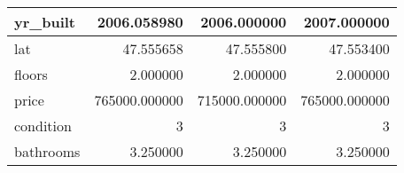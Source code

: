 \begin{table}[H]
\begin{tabular}{|l|r|r|r|}
\hline yr\_built & \cellcolor[rgb]{0.9, 0.54, 0.52} 2006.058980 & 2006.000000 & 2007.000000 \\
\hline lat & \cellcolor[rgb]{0.9, 0.54, 0.52} 47.555658 & 47.555800 & 47.553400 \\
\hline floors & \cellcolor[rgb]{0.9, 0.54, 0.52} 2.000000 & \cellcolor[rgb]{0.9, 0.54, 0.52} 2.000000 & \cellcolor[rgb]{0.9, 0.54, 0.52} 2.000000 \\
\hline price & \cellcolor[rgb]{0.9, 0.54, 0.52} 765000.000000 & 715000.000000 & \cellcolor[rgb]{0.9, 0.54, 0.52} 765000.000000 \\
\hline condition & \cellcolor[rgb]{0.9, 0.54, 0.52} 3 & \cellcolor[rgb]{0.9, 0.54, 0.52} 3 & \cellcolor[rgb]{0.9, 0.54, 0.52} 3 \\
\hline bathrooms & \cellcolor[rgb]{0.9, 0.54, 0.52} 3.250000 & \cellcolor[rgb]{0.9, 0.54, 0.52} 3.250000 & \cellcolor[rgb]{0.9, 0.54, 0.52} 3.250000 \\
\hline
\end{tabular}
\end{table}
